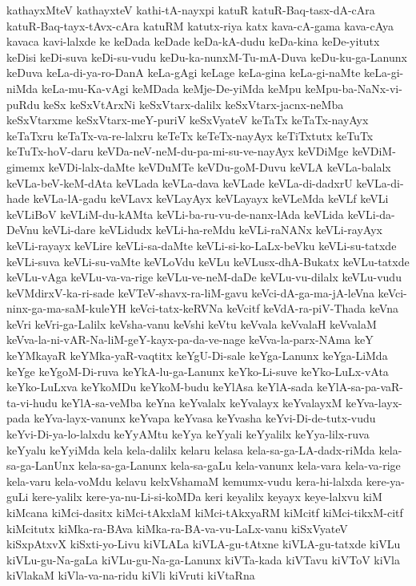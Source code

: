 {kathayxMteV
kathayxteV
kathi-tA-nayxpi
katuR
katuR-Baq-tasx-dA-cAra
katuR-Baq-tayx-tAvx-cAra
katuRM
katutx-riya
katx
kava-cA-gama
kava-cAya
kavaca
kavi-lalxde
ke
keDada
keDade
keDa-kA-dudu
keDa-kina
keDe-yitutx
keDisi
keDi-suva
keDi-su-vudu
keDu-ka-nunxM-Tu-mA-Duva
keDu-ku-ga-Lanunx
keDuva
keLa-di-ya-ro-DanA
keLa-gAgi
keLage
keLa-gina
keLa-gi-naMte
keLa-gi-niMda
keLa-mu-Ka-vAgi
keMDada
keMje-De-yiMda
keMpu
keMpu-ba-NaNx-vi-puRdu
keSx
keSxVtArxNi
keSxVtarx-dalilx
keSxVtarx-jacnx-neMba
keSxVtarxme
keSxVtarx-meY-puriV
keSxVyateV
keTaTx
keTaTx-nayAyx
keTaTxru
keTaTx-va-re-lalxru
keTeTx
keTeTx-nayAyx
keTiTxtutx
keTuTx
keTuTx-hoV-daru
keVDa-neV-neM-du-pa-mi-su-ve-nayAyx
keVDiMge
keVDiM-gimemx
keVDi-lalx-daMte
keVDuMTe
keVDu-goM-Duvu
keVLA
keVLa-balalx
keVLa-beV-keM-dAta
keVLada
keVLa-dava
keVLade
keVLa-di-dadxrU
keVLa-di-hade
keVLa-lA-gadu
keVLavx
keVLayAyx
keVLayayx
keVLeMda
keVLf
keVLi
keVLiBoV
keVLiM-du-kAMta
keVLi-ba-ru-vu-de-nanx-lAda
keVLida
keVLi-da-DeVnu
keVLi-dare
keVLidudx
keVLi-ha-reMdu
keVLi-raNANx
keVLi-rayAyx
keVLi-rayayx
keVLire
keVLi-sa-daMte
keVLi-si-ko-LaLx-beVku
keVLi-su-tatxde
keVLi-suva
keVLi-su-vaMte
keVLoVdu
keVLu
keVLusx-dhA-Bukatx
keVLu-tatxde
keVLu-vAga
keVLu-va-va-rige
keVLu-ve-neM-daDe
keVLu-vu-dilalx
keVLu-vudu
keVMdirxV-ka-ri-sade
keVTeV-shavx-ra-liM-gavu
keVci-dA-ga-ma-jA-leVna
keVci-ninx-ga-ma-saM-kuleYH
keVci-tatx-keRVNa
keVcitf
keVdA-ra-piV-Thada
keVna
keVri
keVri-ga-Lalilx
keVsha-vanu
keVshi
keVtu
keVvala
keVvalaH
keVvalaM
keVva-la-ni-vAR-Na-liM-geY-kayx-pa-da-ve-nage
keVva-la-parx-NAma
keY
keYMkayaR
keYMka-yaR-vaqtitx
keYgU-Di-sale
keYga-Lanunx
keYga-LiMda
keYge
keYgoM-Di-ruva
keYkA-lu-ga-Lanunx
keYko-Li-suve
keYko-LuLx-vAta
keYko-LuLxva
keYkoMDu
keYkoM-budu
keYlAsa
keYlA-sada
keYlA-sa-pa-vaR-ta-vi-hudu
keYlA-sa-veMba
keYna
keYvalalx
keYvalayx
keYvalayxM
keYva-layx-pada
keYva-layx-vanunx
keYvapa
keYvasa
keYvasha
keYvi-Di-de-tutx-vudu
keYvi-Di-ya-lo-lalxdu
keYyAMtu
keYya
keYyali
keYyalilx
keYya-lilx-ruva
keYyalu
keYyiMda
kela
kela-dalilx
kelaru
kelasa
kela-sa-ga-LA-dadx-riMda
kela-sa-ga-LanUnx
kela-sa-ga-Lanunx
kela-sa-gaLu
kela-vanunx
kela-vara
kela-va-rige
kela-varu
kela-voMdu
kelavu
kelxVshamaM
kemumx-vudu
kera-hi-lalxda
kere-ya-guLi
kere-yalilx
kere-ya-nu-Li-si-koMDa
keri
keyalilx
keyayx
keye-lalxvu
kiM
kiMcana
kiMci-dasitx
kiMci-tAkxlaM
kiMci-tAkxyaRM
kiMcitf
kiMci-tikxM-citf
kiMcitutx
kiMka-ra-BAva
kiMka-ra-BA-va-vu-LaLx-vanu
kiSxVyateV
kiSxpAtxvX
kiSxti-yo-Livu
kiVLALa
kiVLA-gu-tAtxne
kiVLA-gu-tatxde
kiVLu
kiVLu-gu-Na-gaLa
kiVLu-gu-Na-ga-Lanunx
kiVTa-kada
kiVTavu
kiVToV
kiVla
kiVlakaM
kiVla-va-na-ridu
kiVli
kiVruti
kiVtaRna
}
